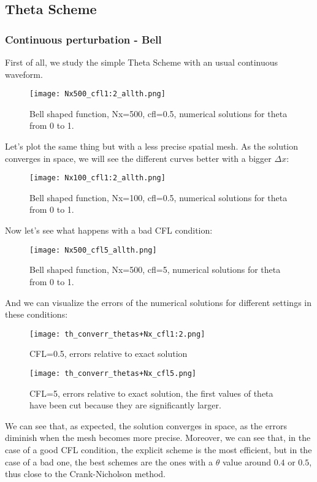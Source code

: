 \documentclass[12pt]{article}
\begin{document}
\subsection*{Theta Scheme}

\subsubsection*{Continuous perturbation - Bell}

First of all, we study the simple Theta Scheme with an usual continuous waveform.
\begin{figure}[H]
    \centering
    \texttt{[image: Nx500\_cfl1:2\_allth.png]}
    \caption{Bell shaped function, Nx=500, cfl=0.5, numerical solutions for theta from 0 to 1.}
\end{figure}

Let's plot the same thing but with a less precise spatial mesh. As the solution converges in space, we will see the different curves better with a bigger $\Delta x$:
\begin{figure}[H]
    \centering
    \texttt{[image: Nx100\_cfl1:2\_allth.png]}
    \caption{Bell shaped function, Nx=100, cfl=0.5, numerical solutions for theta from 0 to 1.}
\end{figure}

Now let's see what happens with a bad CFL condition:
\begin{figure}[H]
    \centering
    \texttt{[image: Nx500\_cfl5\_allth.png]}
    \caption{Bell shaped function, Nx=500, cfl=5, numerical solutions for theta from 0 to 1.}
\end{figure}

And we can visualize the errors of the numerical solutions for different settings in these conditions:

\begin{figure}[H]
    \centering
    \texttt{[image: th\_converr\_thetas+Nx\_cfl1:2.png]}
    \caption{CFL=0.5, errors relative to exact solution}
\end{figure}

\begin{figure}[H]
    \centering
    \texttt{[image: th\_converr\_thetas+Nx\_cfl5.png]}
    \caption{CFL=5, errors relative to exact solution, the first values of theta have been cut because they are significantly larger.}
\end{figure}
We can see that, as expected, the solution converges in space, as the errors diminish when the mesh becomes more precise.
Moreover, we can see that, in the case of a good CFL condition, the explicit scheme is the most efficient, but in the case of a bad one, the best schemes are the ones with a $\theta$ value around $0.4$ or $0.5$, thus close to the Crank-Nicholson method.
\end{document}
